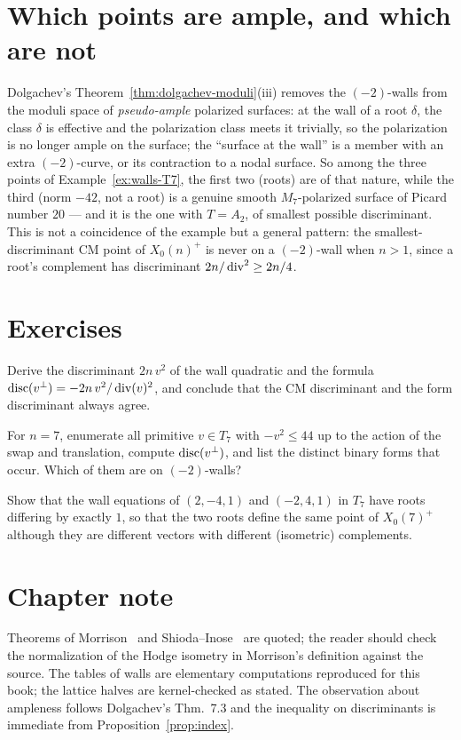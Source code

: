 \section{Which points are ample, and which are not}

Dolgachev's Theorem~\ref{thm:dolgachev-moduli}(iii) removes the $(-2)$-walls
from the moduli space of \emph{pseudo-ample} polarized surfaces: at the wall
of a root $\delta$, the class $\delta$ is effective and the polarization
class meets it trivially, so the polarization is no longer ample on the
surface; the ``surface at the wall'' is a member with an extra $(-2)$-curve,
or its contraction to a nodal surface. So among the three points of
Example~\ref{ex:walls-T7}, the first two (roots) are of that nature, while the
third (norm $-42$, not a root) is a genuine smooth $M_7$-polarized surface of
Picard number $20$ --- and it is the one with $T=A_2$, of smallest possible
discriminant. This is not a coincidence of the example but a general pattern:
the smallest-discriminant CM point of $X_0(n)^+$ is never on a $(-2)$-wall
when $n>1$, since a root's complement has discriminant $2n/\operatorname{div}^2\ge 2n/4$.

\section{Exercises}

\begin{exercise}[$\star$]
Derive the discriminant $2n\,v^2$ of the wall quadratic and the formula
$\operatorname{disc}(v^{\perp})=-2n\,v^2/\operatorname{div}(v)^2$, and conclude that the CM discriminant
and the form discriminant always agree.
\end{exercise}

\begin{exercise}
For $n=7$, enumerate all primitive $v\in T_7$ with $-v^2\le 44$ up to the
action of the swap and translation, compute $\operatorname{disc}(v^{\perp})$, and list the
distinct binary forms that occur. Which of them are on $(-2)$-walls?
\end{exercise}

\begin{exercise}
Show that the wall equations of $(2,-4,1)$ and $(-2,4,1)$ in $T_7$ have roots
differing by exactly $1$, so that the two roots define the same point of
$X_0(7)^+$ although they are different vectors with different (isometric)
complements.
\end{exercise}

\section*{Chapter note}

Theorems of Morrison~\cite{Morrison1984} and Shioda--Inose~\cite{ShiodaInose1977}
are quoted; the reader should check the normalization of the Hodge isometry in
Morrison's definition against the source. The tables of walls are elementary
computations reproduced for this book; the lattice halves are kernel-checked as
stated. The observation about ampleness follows Dolgachev's Thm.~7.3 and the
inequality on discriminants is immediate from Proposition~\ref{prop:index}.
